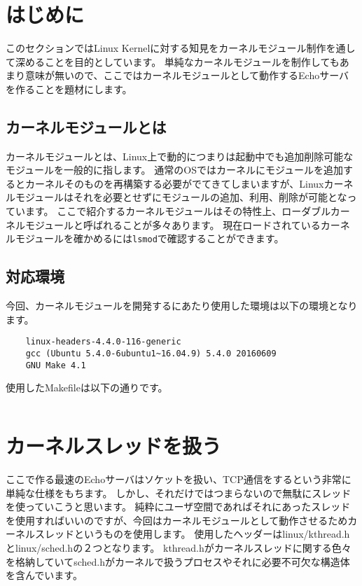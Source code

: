 \section{はじめに}
このセクションではLinux Kernelに対する知見をカーネルモジュール制作を通して深めることを目的としています。
単純なカーネルモジュールを制作してもあまり意味が無いので、ここではカーネルモジュールとして動作するEchoサーバを作ることを題材にします。

\subsection{カーネルモジュールとは}
カーネルモジュールとは、Linux上で動的につまりは起動中でも追加削除可能なモジュールを一般的に指します。
通常のOSではカーネルにモジュールを追加するとカーネルそのものを再構築する必要がでてきてしまいますが、Linuxカーネルモジュールはそれを必要とせずにモジュールの追加、利用、削除が可能となっています。
ここで紹介するカーネルモジュールはその特性上、ローダブルカーネルモジュールと呼ばれることが多々あります。
現在ロードされているカーネルモジュールを確かめるには\texttt{lsmod}で確認することができます。

\subsection{対応環境}
今回、カーネルモジュールを開発するにあたり使用した環境は以下の環境となります。
\begin{verbatim}
    linux-headers-4.4.0-116-generic
    gcc (Ubuntu 5.4.0-6ubuntu1~16.04.9) 5.4.0 20160609
    GNU Make 4.1
\end{verbatim}

使用したMakefileは以下の通りです。
\inputminted[frame=lines,framesep=2mm,baselinestretch=1.2,fontsize=\footnotesize,linenos,breaklines]{bash}{\lrfasset/Makefile}

\section{カーネルスレッドを扱う}
ここで作る最速のEchoサーバはソケットを扱い、TCP通信をするという非常に単純な仕様をもちます。
しかし、それだけではつまらないので無駄にスレッドを使っていこうと思います。
純粋にユーザ空間であればそれにあったスレッドを使用すればいいのですが、今回はカーネルモジュールとして動作させるためカーネルスレッドというものを使用します。
使用したヘッダーはlinux/kthread.hとlinux/sched.hの２つとなります。
kthread.hがカーネルスレッドに関する色々を格納していてsched.hがカーネルで扱うプロセスやそれに必要不可欠な構造体を含んでいます。

